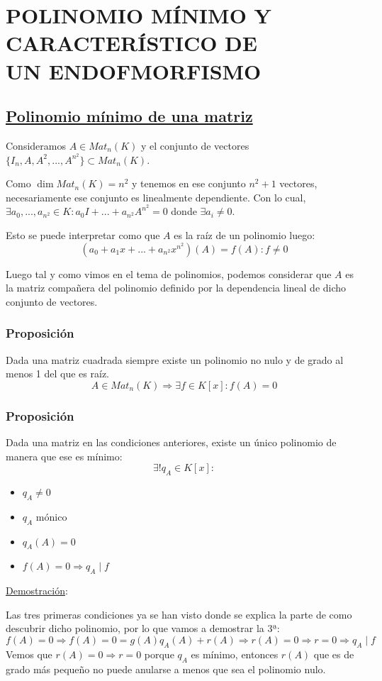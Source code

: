 \documentclass[10pt,a4paper,openright]{book}
\begin{document}
\section*{POLINOMIO MÍNIMO Y CARACTERÍSTICO DE \\UN ENDOFMORFISMO}
\subsection*{\underline{Polinomio mínimo de una matriz}}
Consideramos $A\in Mat_n(K)$ y el conjunto de vectores $\{I_n, A, A^2, ..., A^{n^2}\}\subset Mat_n(K)$.

Como $\dim Mat_n(K)= n^2$ y tenemos en ese conjunto $n^2+1$ vectores, necesariamente ese conjunto es linealmente dependiente. Con lo cual, $\exists a_0, ..., a_{n^2}\in K: a_0I+...+a_{n^2}A^{n^2}=0$ donde $\exists a_i \neq 0$.

Esto se puede interpretar como que $A$ es la raíz de un polinomio luego:
$$(a_0+a_1x+...+a_{n^2}x^{n^2})(A)=f(A): f\neq 0$$

Luego tal y como vimos en el tema de polinomios, podemos considerar que $A$ es la matriz compañera del polinomio definido por la dependencia lineal de dicho conjunto de vectores.

\subsubsection*{Proposición}
Dada una matriz cuadrada siempre existe un polinomio no nulo y de grado al menos 1 del que es raíz.
$$A\in Mat_n(K)\Rightarrow \exists f\in K[x]: f(A)=0$$

\subsubsection*{Proposición}
Dada una matriz en las condiciones anteriores, existe un único polinomio de manera que ese es mínimo:
$$\exists! q_A\in K[x]:$$
\begin{itemize}
\item $q_A\neq 0$
\item $q_A \mbox{ mónico }$
\item $q_A(A)=0$
\item $f(A)=0\Rightarrow q_A\mid f$
\end{itemize}

\underline{Demostración}:\par
Las tres primeras condiciones ya se han visto donde se explica la parte de como descubrir dicho polinomio, por lo que vamos a demostrar la 3ª:
$$f(A) = 0 \Rightarrow f(A)=0= g(A)q_A(A)+r(A)\Rightarrow r(A)=0\Rightarrow r=0\Rightarrow q_A\mid f$$
Vemos que $r(A)=0\Rightarrow r=0$ porque $q_A$ es mínimo, entonces $r(A)$ que es de grado más pequeño no puede anularse a menos que sea el polinomio nulo.
\end{document}
